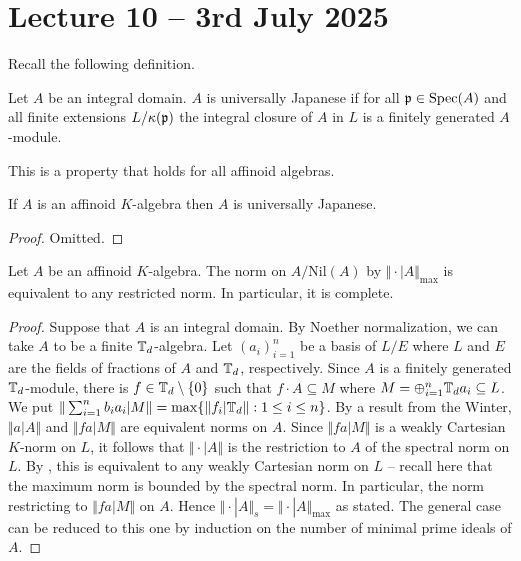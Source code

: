 \section{Lecture 10 -- 3rd July 2025}\label{sec: lecture 10}
Recall the following definition. 
\begin{definition}\label{def: universally Japanese}
    Let $A$ be an integral domain. $A$ is universally Japanese if for all $\mathfrak{p}\in\operatorname{Spec}(A)$ and all finite extensions $L/\kappa(\mathfrak{p})$ the integral closure of $A$ in $L$ is a finitely generated $A$-module. 
\end{definition}
This is a property that holds for all affinoid algebras. 
\begin{proposition}\label{prop: affinoid implies univ Jap}
    If $A$ is an affinoid $K$-algebra then $A$ is universally Japanese. 
\end{proposition}
\begin{proof}
    Omitted. 
\end{proof}
\begin{proposition}\label{prop: maximum norm is complete}
    Let $A$ be an affinoid $K$-algebra. The norm on $A/\mathrm{Nil}(A)$ by $\Vert\cdot|A\Vert_{\max}$ is equivalent to any restricted norm. In particular, it is complete. 
\end{proposition}
\begin{proof}
    Suppose that $A$ is an integral domain. By Noether normalization, we can take $A$ to be a finite $\mathbb{T}_{d}$-algebra. Let $(a_{i})_{i=1}^{n}$ be a basis of $L/E$ where $L$ and $E$ are the fields of fractions of $A$ and $\mathbb{T}_{d}$, respectively. Since $A$ is a finitely generated $\mathbb{T}_{d}$-module, there is $f\in\mathbb{T}_{d}\setminus\{0\}$ such that $f\cdot A\subseteq M$ where $M=\oplus_{i=1}^{n}\mathbb{T}_{d}a_{i}\subseteq L$. We put $\Vert\sum_{i=1}^{n}b_{i}a_{i}|M\Vert=\max\{\Vert f_{i}|\mathbb{T}_{d}\Vert:1\leq i\leq n\}$. By a result from the Winter, $\Vert a|A\Vert$ and $\Vert fa|M\Vert$ are equivalent norms on $A$. Since $\Vert fa|M\Vert$ is a weakly Cartesian $K$-norm on $L$, it follows that $\Vert\cdot|A\Vert$ is the restriction to $A$ of the spectral norm on $L$. By , this is equivalent to any weakly Cartesian norm on $L$ -- recall here that the maximum norm is bounded by the spectral norm. In particular, the norm restricting to $\Vert fa|M\Vert$ on $A$. Hence $\Vert\cdot|A\Vert_{s}=\Vert\cdot|A\Vert_{\max}$ as stated. The general case can be reduced to this one by induction on the number of minimal prime ideals of $A$. 
\end{proof} %
